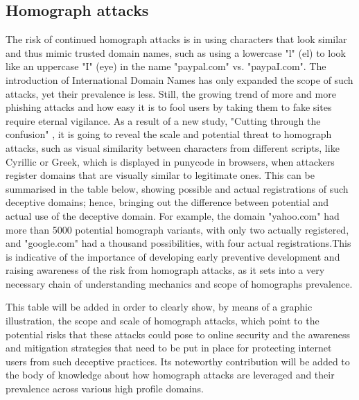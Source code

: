 \subsection {Homograph attacks} 


The risk of continued homograph attacks is in using characters that look similar and thus mimic trusted domain names, such as using a lowercase "l" (el) to look like an uppercase "I" (eye) in the name "paypal.com" vs. "paypaI.com". The introduction of International Domain Names has only expanded the scope of such attacks, yet their prevalence is less. Still, the growing trend of more and more phishing attacks and how easy it is to fool users by taking them to fake sites require eternal vigilance. As a result of a new study, "Cutting through the confusion" \cite{holgers2006homograph}, it is going to reveal the scale and potential threat to homograph attacks, such as visual similarity between characters from different scripts, like Cyrillic or Greek, which is displayed in punycode in browsers, when attackers register domains that are visually similar to legitimate ones. This can be summarised in the table below, showing possible and actual registrations of such deceptive domains; hence, bringing out the difference between potential and actual use of the deceptive domain. For example, the domain "yahoo.com" had more than 5000 potential homograph variants, with only two actually registered, and "google.com" had a thousand possibilities, with four actual registrations.This is indicative of the importance of developing early preventive development and raising awareness of the risk from homograph attacks, as it sets into a very necessary chain of understanding mechanics and scope of homographs prevalence.

This table will be added in order to clearly show, by means of a graphic illustration, the scope and scale of homograph attacks, which point to the potential risks that these attacks could pose to online security and the awareness and mitigation strategies that need to be put in place for protecting internet users from such deceptive practices. Its noteworthy contribution will be added to the body of knowledge about how homograph attacks are leveraged and their prevalence across various high profile domains.



